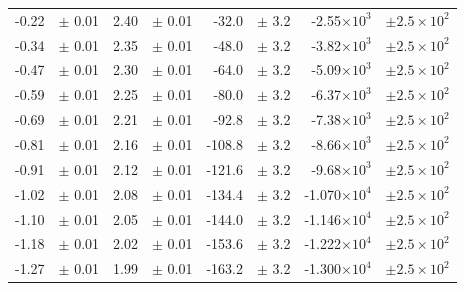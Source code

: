 \documentclass[a4paper]{article}
\begin{document}
\begin{table}[htbp]
\begin{tabular}{rlrlrlrl}
-0.22 & $\pm$ 0.01 & 2.40 & $\pm$ 0.01 & -32.0 & $\pm$ 3.2 & -2.55$\times 10^{3}$ & $\pm 2.5 \times 10^{2}$  \\ 
-0.34 & $\pm$ 0.01 & 2.35 & $\pm$ 0.01 & -48.0 & $\pm$ 3.2 & -3.82$\times 10^{3}$ & $\pm 2.5 \times 10^{2}$  \\ 
-0.47 & $\pm$ 0.01 & 2.30 & $\pm$ 0.01 & -64.0 & $\pm$ 3.2 & -5.09$\times 10^{3}$ & $\pm 2.5 \times 10^{2}$  \\ 
-0.59 & $\pm$ 0.01 & 2.25 & $\pm$ 0.01 & -80.0 & $\pm$ 3.2 & -6.37$\times 10^{3}$ & $\pm 2.5 \times 10^{2}$  \\ 
-0.69 & $\pm$ 0.01 & 2.21 & $\pm$ 0.01 & -92.8 & $\pm$ 3.2 & -7.38$\times 10^{3}$ & $\pm 2.5 \times 10^{2}$  \\ 
-0.81 & $\pm$ 0.01 & 2.16 & $\pm$ 0.01 & -108.8 & $\pm$ 3.2 & -8.66$\times 10^{3}$ & $\pm 2.5 \times 10^{2}$  \\ 
-0.91 & $\pm$ 0.01 & 2.12 & $\pm$ 0.01 & -121.6 & $\pm$ 3.2 & -9.68$\times 10^{3}$ & $\pm 2.5 \times 10^{2}$  \\ 
-1.02 & $\pm$ 0.01 & 2.08 & $\pm$ 0.01 & -134.4 & $\pm$ 3.2 & -1.070$\times 10^{4}$ & $\pm 2.5 \times 10^{2}$  \\ 
-1.10 & $\pm$ 0.01 & 2.05 & $\pm$ 0.01 & -144.0 & $\pm$ 3.2 & -1.146$\times 10^{4}$ & $\pm 2.5 \times 10^{2}$  \\ 
-1.18 & $\pm$ 0.01 & 2.02 & $\pm$ 0.01 & -153.6 & $\pm$ 3.2 & -1.222$\times 10^{4}$ & $\pm 2.5 \times 10^{2}$  \\ 
-1.27 & $\pm$ 0.01 & 1.99 & $\pm$ 0.01 & -163.2 & $\pm$ 3.2 & -1.300$\times 10^{4}$ & $\pm 2.5 \times 10^{2}$  \\ 
\hline
\end{tabular}
\label{calibracao}
\end{table}
\end{document}
